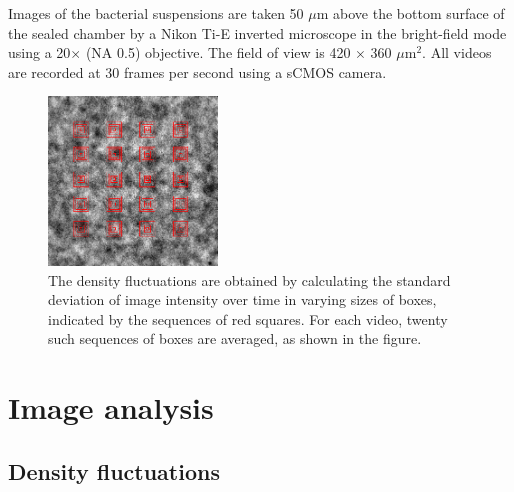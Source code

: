 \documentclass[twocolumn,aps,prx,amsmath,amssymb,longbibliography]{revtex4-2}
\begin{document}
Images of the bacterial suspensions are taken 50 $\mu$m above the bottom surface of the sealed chamber by a Nikon Ti-E inverted microscope in the bright-field mode using a 20$\times$ (NA 0.5) objective. The field of view is 420 $\times$ 360 $\mu$m$^2$. All videos are recorded at 30 frames per second using a sCMOS camera.

\begin{figure}[t]
	\begin{center}
		\includegraphics[width=0.4\textwidth]{figures/fig-7.pdf}
		\caption[GNF calculations]
		{
      The density fluctuations are obtained by calculating the standard deviation of image intensity over time in varying sizes of boxes, indicated by the sequences of red squares. For each video, twenty such sequences of boxes are averaged, as shown in the figure.
		}
		\label{GNF-calculation}
	\end{center}
\end{figure}


\section{Image analysis} \label{appendix-IA}
\subsection{Density fluctuations} \label{sec:GNF-calculations}
\end{document}
